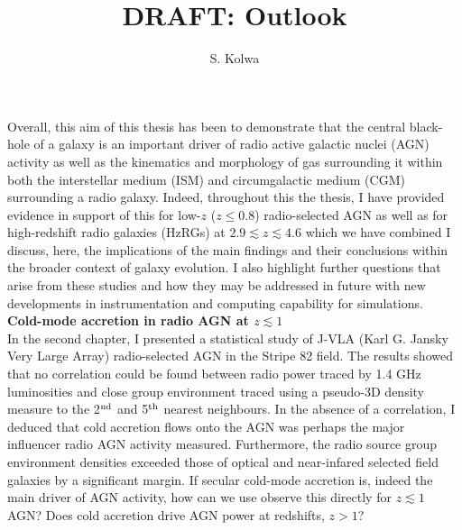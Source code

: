 \documentclass[10pt,a4paper]{article}
\begin{document}
\title{{\bf DRAFT:} Outlook }
\author{S. Kolwa}
\maketitle

Overall, this aim of this thesis has been to demonstrate that the central black-hole of a galaxy is an important driver of radio active galactic nuclei (AGN) activity as well as the kinematics and morphology of gas surrounding it within both the interstellar medium (ISM) and circumgalactic medium (CGM) surrounding a radio galaxy. Indeed, throughout this the thesis, I have provided evidence in support of this for low-$z$ ($z \leq 0.8$) radio-selected AGN as well as for high-redshift radio galaxies (HzRGs) at $2.9 \lesssim z \lesssim 4.6$ which we have combined I discuss, here, the implications of the main findings and their conclusions within the broader context of galaxy evolution. I also highlight further questions that arise from these studies and how they may be addressed in future with new developments in instrumentation and computing capability for simulations. \\

{\bf Cold-mode accretion in radio AGN at $z \lesssim 1$}\\

In the second chapter, I presented a statistical study of J-VLA (Karl G. Jansky Very Large Array) radio-selected AGN in the Stripe 82 field. The results showed that no correlation could be found between radio power traced by 1.4 GHz luminosities and close group environment traced using a pseudo-3D density measure to the 2$^{\rm nd}$ and 5$^{\rm th}$ nearest neighbours. In the absence of a correlation, I deduced that cold accretion flows onto the AGN was perhaps the major influencer radio AGN activity measured. Furthermore, the radio source group environment densities exceeded those of optical and near-infared selected field galaxies by a significant margin. If secular cold-mode accretion is, indeed the main driver of AGN activity, how can we use observe this directly for $z \lesssim 1$ AGN? Does cold accretion drive AGN power at redshifts, $z > 1$?\\
\end{document}
